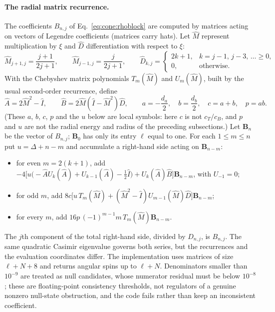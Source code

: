 \documentclass[11pt,a4paper]{article}
\numberwithin{equation}{section}
\begin{document}
\paragraph{The radial matrix recurrence.} The coefficients $B_{n,j}$ of Eq.~\eqref{eq:cone:rhoblock} are computed by
matrices acting on vectors of Legendre coefficients (matrices carry hats). Let $\hat M$ represent multiplication by
$\xi$ and $\hat D$ differentiation with respect to $\xi$:
\begin{equation}
 \hat M_{j+1,j}=\frac{j+1}{2j+1},\qquad \hat M_{j-1,j}=\frac{j}{2j+1},\qquad
 \hat D_{k,j}=\begin{cases}2k+1,&k=j-1,\,j-3,\,\dots\ge0,\\0,&\text{otherwise}.\end{cases}
\end{equation}
With the Chebyshev matrix polynomials $T_m(\hat M)$ and $U_m(\hat M)$, built by the usual second-order recurrence,
define
\begin{equation}
 \hat A=2\hat M^2-\hat I,\qquad \hat B=2\hat M(\hat I-\hat M^2)\hat D,\qquad
 a=-\frac{d_a}2,\quad b=\frac{d_b}2,\quad c=a+b,\quad p=ab .
\end{equation}
(These $a$, $b$, $c$, $p$ and the $u$ below are local symbols: here $c$ is not $c_T/c_B$, and $p$ and $u$ are not
the radial energy and radius of the preceding subsections.) Let $\boldsymbol B_n$ be the vector of $B_{n,j}$;
$\boldsymbol B_0$ has only its entry $\ell$ equal to one. For each
$1\le m\le n$ put $u=\Delta+n-m$ and accumulate a right-hand side acting on $\boldsymbol B_{n-m}$:
\begin{itemize}
\item for even $m=2(k+1)$, add $-4\bigl[u\bigl(-\hat AU_k(\hat A)+U_{k-1}(\hat A)-\tfrac12\hat I\bigr)+U_k(\hat A)\hat B\bigr]\boldsymbol B_{n-m}$,
 with $U_{-1}=0$;
\item for odd $m$, add $8c\bigl[u\,T_m(\hat M)+(\hat M^2-\hat I)U_{m-1}(\hat M)\hat D\bigr]\boldsymbol B_{n-m}$;
\item for every $m$, add $16p\,(-1)^{m-1}m\,T_m(\hat M)\boldsymbol B_{n-m}$.
\end{itemize}
The $j$th component of the total right-hand side, divided by $D_{n,j}$, is $B_{n,j}$. The same quadratic Casimir
eigenvalue governs both series, but the recurrences and the evaluation coordinates differ. The implementation uses
matrices of size $\ell+N+8$ and returns angular spins up to $\ell+N$. Denominators smaller than $10^{-9}$ are treated as
null candidates, whose numerator residual must be below $10^{-8}$; these are floating-point consistency thresholds, not
regulators of a genuine nonzero null-state obstruction, and the code fails rather than keep an inconsistent
coefficient.
\end{document}

